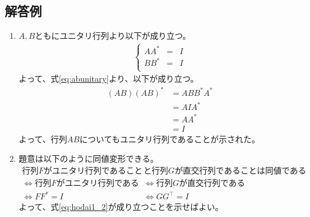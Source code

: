 \documentclass[dvipdfmx,titlepage, 11pt, a4paper]{jsarticle}%
\begin{document}
\newpage

\subsection{解答例}
\begin{enumerate}[(1)]
    \setlength{\itemsep}{10pt}
    \item $A, B$ともにユニタリ行列より以下が成り立つ。
    \begin{align}
        \left\{
            \begin{array}{lcl}
            AA^{\ast} &=& I\\ 
            BB^{\ast} &=& I\\ 
            \end{array}
        \right.\label{eq:abunitary}
    \end{align}
    よって、式\eqref{eq:abunitary}より、以下が成り立つ。
    \begin{align*}
        (AB)(AB)^{\ast} & = ABB^{\ast}A^{\ast}\\
                        & = AIA^{\ast}\\
                        & = AA^{\ast}\\
                        & = I
    \end{align*}
    よって、行列$AB$についてもユニタリ行列であることが示された。
    \item 題意は以下のように同値変形できる。
    \begin{align}
        \mbox{行列$F$がユニタリ行列であること}&\mbox{と行列$G$が直交行列であることは同値である}\nonumber\\
        \Longleftrightarrow \mbox{行列$F$がユニタリ行列である} &\Leftrightarrow \mbox{行列$G$が直交行列である} \nonumber\\
        \Longleftrightarrow FF^{\ast} = I &\Leftrightarrow GG^{\top} = I\label{eq:hodai1_2}
    \end{align}
    よって、式\eqref{eq:hodai1_2}が成り立つことを示せばよい。


\end{enumerate}
\end{document}
